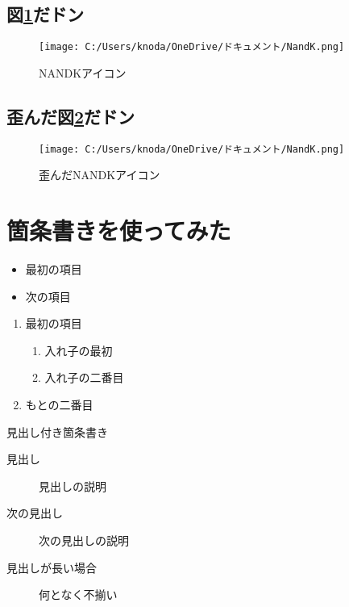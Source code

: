 \documentclass[a4paper, uplatex]{jlreq}
\newcommand{\明石}{明石工業高等専門がおっこう電機情報工学科}
\begin{document}
	\subsection{図\ref{nandk1}だドン}
	\begin{figure}[http]
		\centering
		\texttt{[image: C:/Users/knoda/OneDrive/ドキュメント/NandK.png]}
		\caption{NANDKアイコン}
		\label{nandk1}
	\end{figure}
	
	\newpage
	\subsection{歪んだ図\ref{nandk2}だドン}
	\begin{figure}[http]
		\centering
		\texttt{[image: C:/Users/knoda/OneDrive/ドキュメント/NandK.png]}
		\caption{歪んだNANDKアイコン}
		\label{nandk2}
	\end{figure}
	
	\newpage
	\section{箇条書きを使ってみた}
	\begin{itemize}
		\item 最初の項目
		\item 次の項目
	\end{itemize}
	
	\begin{enumerate}
		\item 最初の項目
		\begin{enumerate}
			\item 入れ子の最初
			\item 入れ子の二番目
		\end{enumerate}
		\item もとの二番目
	\end{enumerate}
	
	見出し付き箇条書き
	\begin{description}
		\item[見出し] 見出しの説明
		\item[次の見出し] 次の見出しの説明
		\item[見出しが長い場合] 何となく不揃い
	\end{description}
	
	
	
	
\end{document}

